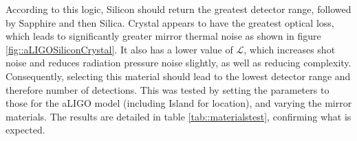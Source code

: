 \documentclass{article}
\begin{document}
According to this logic, Silicon should return the greatest detector range, followed by Sapphire and then Silica. Crystal appears to have the greatest optical loss, which leads to significantly greater mirror thermal noise as shown in figure \ref{fig::aLIGOSiliconCrystal}. It also has a lower value of $\mathcal{L}$, which increases shot noise and reduces radiation pressure noise slightly, as well as reducing complexity. Consequently, selecting this material should lead to the lowest detector range and therefore number of detections. This was tested by setting the parameters to those for the aLIGO model (including Island for location), and varying the mirror materials. The results are detailed in table \ref{tab::materialstest}, confirming what is expected. 
\end{document}
